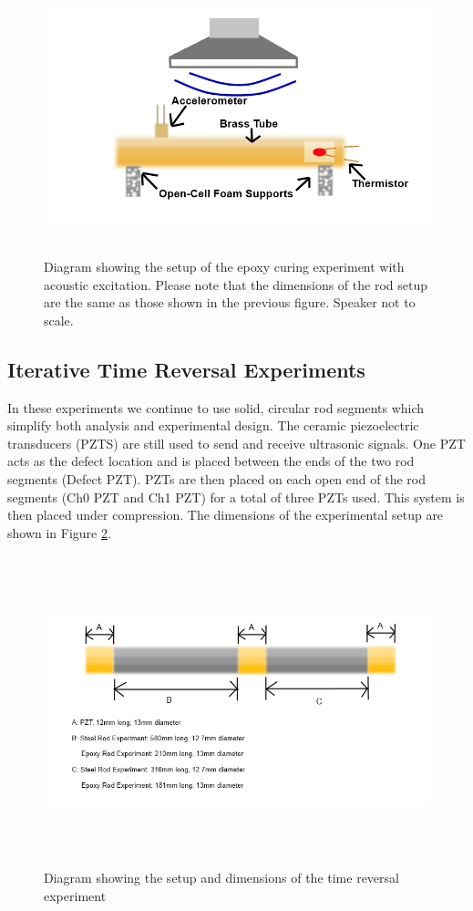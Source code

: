 \documentclass[]{aiaa-tc}%
\begin{document}
\begin{figure}[H]%
\centering
 \includegraphics[height = 8cm]{epoxy_diagram_new_speaker}
 \caption{Diagram showing the setup of the epoxy curing experiment with acoustic excitation. Please note that the dimensions of the rod setup are the same as those shown in the previous figure. Speaker not to scale.}
 \label{fig:epoxy_sound}
\end{figure}


\subsection{Iterative Time Reversal Experiments}

In these experiments we continue to use solid, circular rod segments which simplify both analysis and experimental design. The ceramic piezoelectric transducers (PZTS) are still used to send and receive ultrasonic signals. One PZT acts as the defect location and is placed between the ends of the two rod segments (Defect PZT). PZTs are then placed on each open end of the rod segments (Ch0  PZT and Ch1 PZT) for a total of three PZTs used. This system is then placed under compression. The dimensions of the experimental setup are shown in Figure \ref{fig:tr_dimensions}.

\begin{figure}[H]%
\centering
 \includegraphics[height = 9cm]{tr_dimensions_new}
 \caption{Diagram showing the setup and dimensions of the time reversal experiment}
 \label{fig:tr_dimensions}
\end{figure}
\end{document}
